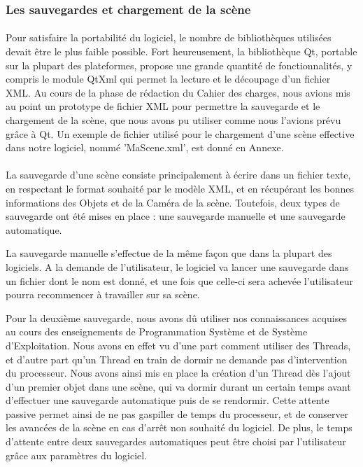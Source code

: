 \subsubsection{Les sauvegardes et chargement de la scène}
\paragraph{}
Pour satisfaire la portabilité du logiciel, le nombre de bibliothèques utilisées devait être le plus faible possible. Fort heureusement, la bibliothèque Qt, portable sur la plupart des plateformes, propose une grande quantité de fonctionnalités, y compris le module QtXml qui permet la lecture et le découpage d'un fichier XML. Au cours de la phase de rédaction du Cahier des charges, nous avions mis au point un prototype de fichier XML pour permettre la sauvegarde et le chargement de la scène, que nous avons pu utiliser comme nous l'avions prévu grâce à Qt. Un exemple de fichier utilisé pour le chargement d'une scène effective dans notre logiciel, nommé 'MaScene.xml', est donné en Annexe.

\paragraph{}
La sauvegarde d'une scène consiste principalement à écrire dans un fichier texte, en respectant le format souhaité par le modèle XML, et en récupérant les bonnes informations des Objets et de la Caméra de la scène. Toutefois, deux types de sauvegarde ont été mises en place : une sauvegarde manuelle et une sauvegarde automatique.

La sauvegarde manuelle s'effectue de la même façon que dans la plupart des logiciels. A la demande de l'utilisateur, le logiciel va lancer une sauvegarde dans un fichier dont le nom est donné, et une fois que celle-ci sera achevée l'utilisateur pourra recommencer à travailler sur sa scène.

Pour la deuxième sauvegarde, nous avons dû utiliser nos connaissances acquises au cours des enseignements de Programmation Système et de Système d'Exploitation. Nous avons en effet vu d'une part comment utiliser des Threads, et d'autre part qu'un Thread en train de dormir ne demande pas d'intervention du processeur. Nous avons ainsi mis en place la création d'un Thread dès l'ajout d'un premier objet dans une scène, qui va dormir durant un certain temps avant d'effectuer une sauvegarde automatique puis de se rendormir. Cette attente passive permet ainsi de ne pas gaspiller de temps du processeur, et de conserver les avancées de la scène en cas d'arrêt non souhaité du logiciel. De plus, le temps d'attente entre deux sauvegardes automatiques peut être choisi par l'utilisateur grâce aux paramètres du logiciel.

